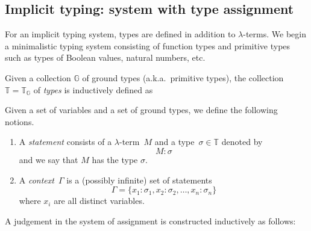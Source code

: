 \subsection{Implicit typing: system with type assignment}
For an implicit typing system, types are defined in addition to $\lambda$-terms.
We begin a minimalistic typing system consisting of function types and primitive
types such as types of Boolean values, natural numbers, etc. 
\begin{definition}
  Given a collection $\mathbb{G}$ of ground types (a.k.a.\ primitive types), the
  collection $\mathbb{T} = \mathbb{T}_\mathbb{G}$ of \emph{types} is inductively
  defined as \begin{multicols}{2}
    \begin{prooftree}
    \end{prooftree}
    \begin{prooftree}
    \end{prooftree}
  \end{multicols}
\end{definition}
\begin{definition}
  Given a set of variables and a set of ground types, we define the following
  notions.
  \begin{enumerate}
    \item A \emph{statement} consists of a $\lambda$-term~$M$
      and a type~$\sigma \in \mathbb{T}$ denoted by 
      \[
        M : \sigma
      \]
      and we say that $M$ has the type $\sigma$.
    \item A \emph{context}~$\Gamma$ is a (possibly infinite) set of statements 
      \[
        \Gamma = \{x_1 : \sigma_1, x_2 : \sigma_2, \ldots, x_n : \sigma_n\}
      \]
      where $x_i$ are all distinct variables. 
  \end{enumerate}
\end{definition}
A judgement in the system of assignment is constructed inductively as follows:
